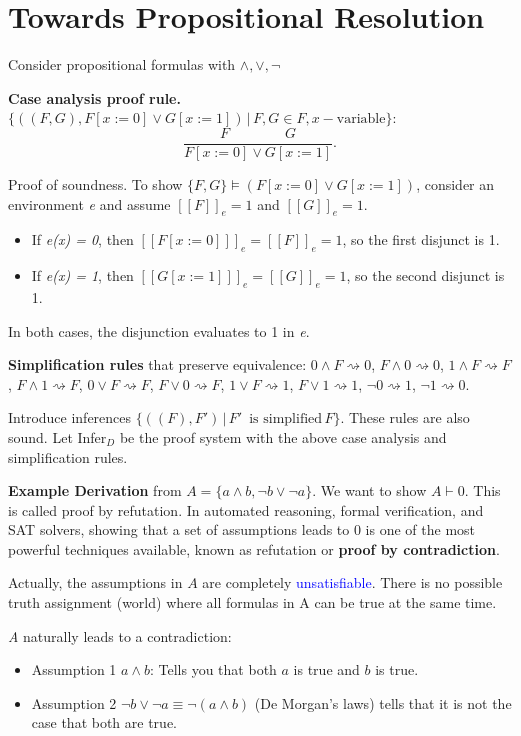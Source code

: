 \documentclass[11pt]{article}
\begin{document}
\section*{Towards Propositional Resolution}

Consider propositional formulas with $\land, \lor, \neg$ 

\textbf{Case analysis proof rule.} $\{((F, G), F[x := 0] \lor G[x := 1]) \, | \, F, G \in F, x - \text{variable}\}$:
\[
	\frac{F \quad \quad \quad \quad G}{F[x := 0] \lor G[x := 1] }
.\] 

Proof of soundness. To show $\{F, G\} \models (F[x := 0] \lor G[x := 1])$, consider an environment \textit{e} and assume $[\![F]\!]_e = 1$ and $[\![G]\!]_e = 1$. 
\begin{itemize}
	\item If \textit{e(x) = 0}, then $[\![F[x := 0]]\!]_e = [\![F]\!]_e = 1$, so the first disjunct is 1. 
	\item If \textit{e(x) = 1}, then $[\![G[x := 1]]\!]_e = [\![G]\!]_e = 1$, so the second disjunct is 1. 
\end{itemize}
In both cases, the disjunction evaluates to 1 in \textit{e}.

\textbf{Simplification rules} that preserve equivalence: $0 \land F \rightsquigarrow 0$, $F \land 0 \rightsquigarrow 0$, $ 1 \land F \rightsquigarrow F$, $F \land 1 \rightsquigarrow F$, $0 \lor F \rightsquigarrow F$, $F \lor 0 \rightsquigarrow F$, $1 \lor F \rightsquigarrow 1$, $F \lor 1 \rightsquigarrow 1$, $\neg 0 \rightsquigarrow 1$, $\neg 1 \rightsquigarrow 0$.  

Introduce inferences $\{((F), F') \, | \, F' \, \text{ is simplified} \, F\}$. These rules are also sound. Let Infer$_D$ be the proof system with the above case analysis and simplification rules.  

\textbf{Example Derivation} from $A = \{a \land b, \neg b \lor \neg a\}$. We want to show $A \vdash 0$. This is called proof by refutation. In automated reasoning, formal verification, and SAT solvers, showing that a set of assumptions leads to 0 is one of the most powerful techniques available, known as refutation or \textbf{proof by contradiction}.  

Actually, the assumptions in $A$ are completely \textcolor{blue}{unsatisfiable}. There is no possible truth assignment (world) where all formulas in A can be true at the same time.

\textit{A} naturally leads to a contradiction:
\begin{itemize}
	\item Assumption 1 $a \land b$: Tells you that both $a$ is true and $b$ is true.
	\item Assumption 2 $\neg b \lor \neg a \equiv \neg(a \land b)$  (De Morgan's laws) tells that it is not the case that both are true.
\end{itemize}
\end{document}

